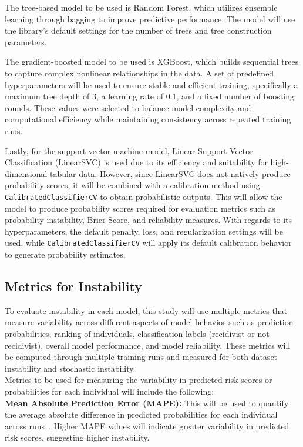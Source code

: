 \documentclass[12pt]{article}
\begin{document}
The tree-based model to be used is Random Forest, which utilizes ensemble learning through bagging to improve predictive performance. The model will use the library's default settings for the number of trees and tree construction parameters.

The gradient-boosted model to be used is XGBoost, which builds sequential trees to capture complex nonlinear relationships in the data. A set of predefined hyperparameters will be used to ensure stable and efficient training, specifically a maximum tree depth of 3, a learning rate of 0.1, and a fixed number of boosting rounds. These values were selected to balance model complexity and computational efficiency while maintaining consistency across repeated training runs. 

Lastly, for the support vector machine model, Linear Support Vector Classification (LinearSVC) is used due to its efficiency and suitability for high-dimensional tabular data. However, since LinearSVC does not natively produce probability scores, it will be combined with a calibration method using \texttt{CalibratedClassifierCV} to obtain probabilistic outputs. This will allow the model to produce probability scores required for evaluation metrics such as probability instability, Brier Score, and reliability measures. With regards to its hyperparameters, the default penalty, loss, and regularization settings will be used, while \texttt{CalibratedClassifierCV} will apply its default calibration behavior to generate probability estimates.

\subsection{Metrics for Instability}
To evaluate instability in each model, this study will use multiple metrics that measure variability across different aspects of model behavior such as prediction probabilities, ranking of individuals, classification labels (recidivist or not recidivist), overall model performance, and model reliability. These metrics will be computed through multiple training runs and measured for both dataset instability and stochastic instability.\\

Metrics to be used for measuring the variability in predicted risk scores or probabilities for each individual will include the following: \\
\textbf{Mean Absolute Prediction Error (MAPE):} This will be used to quantify the average absolute difference in predicted probabilities for each individual across runs~\cite{riley2023stability}. Higher MAPE values will indicate greater variability in predicted risk scores, suggesting higher instability. \\
\end{document}
